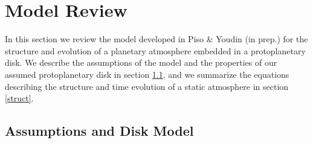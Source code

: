 \documentclass[apj]{emulateapj}
\begin{document}





\section{Model Review}
\label{sec2}


In this section we review the model developed in Piso \& Youdin (in prep.) for the structure and evolution of a planetary atmosphere embedded in a protoplanetary disk. We describe the assumptions of the model and the properties of our assumed protoplanetary disk in section \ref{model}, and we summarize the equations describing the structure and time evolution of a static atmosphere in section \ref{struct}.  

\subsection{Assumptions and Disk Model}
\label{model}
\end{document}
